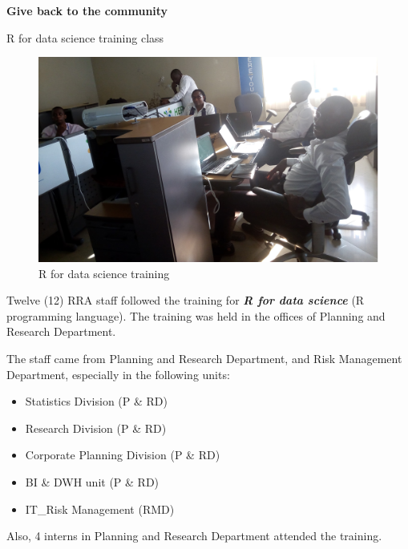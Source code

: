 \documentclass[ignorenonframetext,]{beamer}
\providecommand{\tightlist}{%
  \setlength{\itemsep}{0pt}\setlength{\parskip}{0pt}}
\begin{document}
\begin{frame}

\begin{center}
\textbf{Give back to the community}
\end{center}

\end{frame}

\begin{frame}{R for data science training class}
\protect\hypertarget{r-for-data-science-training-class}{}

\begin{figure}
\centering
\includegraphics{Images/training_1.jpg}
\caption{R for data science training}
\end{figure}

\end{frame}

\begin{frame}

Twelve (12) RRA staff followed the training for
\textit{\textbf{R for data science}} (R programming language). The
training was held in the offices of Planning and Research Department.

The staff came from Planning and Research Department, and Risk
Management Department, especially in the following units:

\begin{itemize}
\tightlist
\item
  Statistics Division (P \& RD)
\item
  Research Division (P \& RD)
\item
  Corporate Planning Division (P \& RD)
\item
  BI \& DWH unit (P \& RD)
\item
  IT\_Risk Management (RMD)
\end{itemize}

Also, 4 interns in Planning and Research Department attended the
training.

\end{frame}
\end{document}
